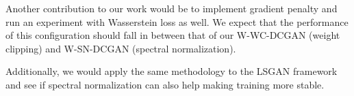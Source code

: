 Another contribution to our work would be to implement gradient penalty and run an experiment with Wasserstein loss as well. We expect that the performance of this configuration should fall in between that of our W-WC-DCGAN (weight clipping) and W-SN-DCGAN (spectral normalization).

Additionally, we would apply the same methodology to the LSGAN framework \cite{mao2017least} and see if spectral normalization can also help making training more stable. 

